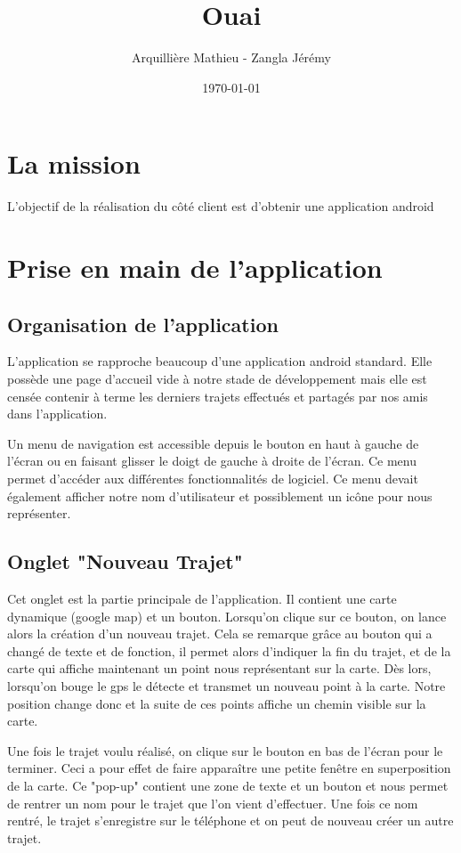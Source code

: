 \documentclass{article}
\title{Ouai}
\author{Arquillière Mathieu - Zangla Jérémy}
\date{\today}
\begin{document}
\begin{titlepage}
  \maketitle
\end{titlepage}

\tableofcontents
\listoffigures
\newpage

\section{La mission}
L'objectif de la réalisation du côté client est d'obtenir une application android

\section{Prise en main de l'application}
\subsection{Organisation de l'application}
L'application se rapproche beaucoup d'une application android standard. Elle possède une page d'accueil vide à notre stade de développement mais
elle est censée contenir à terme les derniers trajets effectués et partagés par nos amis dans l'application.

Un menu de navigation est accessible depuis le bouton en haut à gauche de l'écran ou en faisant glisser le doigt de gauche à droite de l'écran.
Ce menu permet d'accéder aux différentes fonctionnalités de logiciel. Ce menu devait également afficher notre nom d'utilisateur et
possiblement un icône pour nous représenter.

\subsection{Onglet "Nouveau Trajet"}
Cet onglet est la partie principale de l'application. Il contient une carte dynamique (google map) et un bouton. Lorsqu'on clique sur ce
bouton, on lance alors la création d'un nouveau trajet. Cela se remarque grâce au bouton qui a changé de texte et de fonction, il permet
alors d'indiquer la fin du trajet, et de la carte qui affiche maintenant un point nous représentant sur la carte. Dès lors, lorsqu'on bouge
le gps le détecte et transmet un nouveau point à la carte. Notre position change donc et la suite de ces points affiche un chemin visible
sur la carte.

Une fois le trajet voulu réalisé, on clique sur le bouton en bas de l'écran pour le terminer. Ceci a pour effet de faire apparaître une
petite fenêtre en superposition de la carte. Ce "pop-up" contient une zone de texte et un bouton et nous permet de rentrer un nom pour
le trajet que l'on vient d'effectuer. Une fois ce nom rentré, le trajet s'enregistre sur le téléphone et on peut de nouveau créer un
autre trajet.
\end{document}
